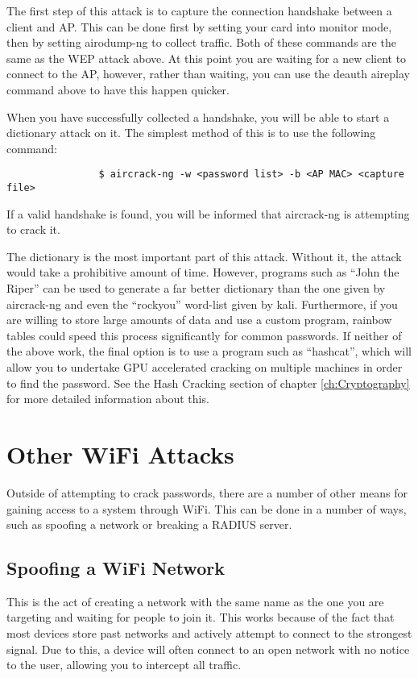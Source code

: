			The first step of this attack is to capture the connection handshake between a client and AP.
			This can be done first by setting your card into monitor mode, then by setting airodump-ng to collect traffic.
			Both of these commands are the same as the WEP attack above.
			At this point you are waiting for a new client to connect to the AP, however, rather than waiting, you can use the deauth aireplay command above to have this happen quicker.

			When you have successfully collected a handshake, you will be able to start a dictionary attack on it.
			The simplest method of this is to use the following command:
			\begin{verbatim}
				$ aircrack-ng -w <password list> -b <AP MAC> <capture file>
			\end{verbatim}
			If a valid handshake is found, you will be informed that aircrack-ng is attempting to crack it.

			The dictionary is the most important part of this attack.
			Without it, the attack would take a prohibitive amount of time.
			However, programs such as ``John the Riper'' can be used to generate a far better dictionary than the one given by aircrack-ng and even the ``rockyou'' word-list given by kali.
			Furthermore, if you are willing to store large amounts of data and use a custom program, rainbow tables could speed this process significantly for common passwords.
			If neither of the above work, the final option is to use a program such as ``hashcat'', which will allow you to undertake GPU accelerated cracking on multiple machines in order to find the password.
			See the Hash Cracking section of chapter \ref{ch:Cryptography} for more detailed information about this.
	\section{Other WiFi Attacks}
		Outside of attempting to crack passwords, there are a number of other means for gaining access to a system through WiFi.
		This can be done in a number of ways, such as spoofing a network or breaking a RADIUS server.
		\subsection{Spoofing a WiFi Network}
			This is the act of creating a network with the same name as the one you are targeting and waiting for people to join it.
			This works because of the fact that most devices store past networks and actively attempt to connect to the strongest signal.
			Due to this, a device will often connect to an open network with no notice to the user, allowing you to intercept all traffic.

